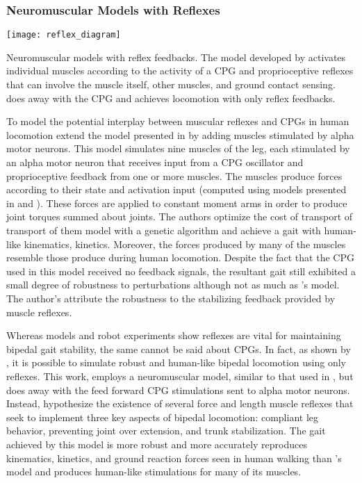\subsubsection{Neuromuscular Models with Reflexes}
\begin{marginfigure}
    \centering
    \texttt{[image: reflex\_diagram]} 
    \caption{Neuromuscular models with reflex feedbacks. The model developed by
    \citet{ogihara2001generation} activates individual muscles according to the
    activity of a CPG and proprioceptive reflexes that can involve the muscle
    itself, other muscles, and ground contact sensing.  \citet{geyer2010muscle}
    does away with the CPG and achieves locomotion with only reflex feedbacks.}
    \label{fig:reflex_diagram}
\end{marginfigure}
To model the potential interplay between muscular reflexes and CPGs in human
locomotion \citet{ogihara2001generation} extend the model presented in
\citet{taga1991self} by adding muscles stimulated by alpha motor neurons. This
model simulates nine muscles of the leg, each stimulated by an alpha motor
neuron that receives input from a CPG oscillator and proprioceptive feedback
from one or more muscles. The muscles produce forces according to their state
and activation input (computed using models presented in
\citet{pierrynowski1985physiological} and \citet{davy1987dynamic}). These forces
are applied to constant moment arms in order to produce joint torques summed
about joints. The authors optimize the cost of transport of transport of them
model with a genetic algorithm and achieve a gait with human-like kinematics,
kinetics. Moreover, the forces produced by many of the muscles resemble those
produce during human locomotion. Despite the fact that the CPG used in this
model received no feedback signals, the resultant gait still exhibited a small
degree of robustness to perturbations although not as much as
\citeauthor{taga1991self}'s model. The author's attribute the robustness to the
stabilizing feedback provided by muscle reflexes. 

Whereas models and robot experiments show reflexes are vital for maintaining
bipedal gait stability, the same cannot be said about CPGs. In fact, as shown by
\citet{geyer2010muscle}, it is possible to simulate robust and human-like
bipedal locomotion using only reflexes. This work, employs a neuromuscular
model, similar to that used in \citet{ogihara2001generation}, but does away with
the feed forward CPG stimulations sent to alpha motor neurons. Instead,
\citeauthor{geyer2010muscle} hypothesize the existence of several force and
length muscle reflexes that seek to implement three key aspects of bipedal
locomotion: compliant leg behavior, preventing joint over extension, and trunk
stabilization. The gait achieved by this model is more robust and more
accurately reproduces kinematics, kinetics, and ground reaction forces seen in
human walking than \citeauthor{ogihara2001generation}'s model and produces
human-like stimulations for many of its muscles.

